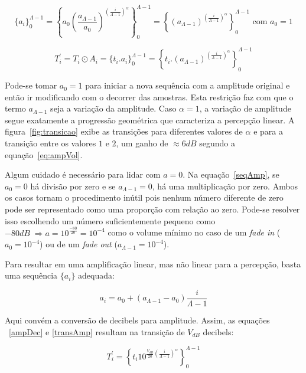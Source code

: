 \begin{equation}\label{seqAmp}
\{a_i\}_0^{\Lambda-1}=\left \{ a_0 \left ( \frac{a_{\Lambda-1}}{a_0} \right )^{\left ( \frac{i}{\Lambda-1} \right )^\alpha} \right \}_0^{\Lambda-1}=\left \{ \left ( {a_{\Lambda-1}} \right )^{\left ( \frac{i}{\Lambda-1} \right )^\alpha} \right \}_0^{\Lambda-1} \text{ com } a_0=1
\end{equation}

\begin{equation}\label{transAmp}
T_i^{'}=T_i \odot A_i = \{t_i . a_i\}_0^{\Lambda-1}=\left \{ t_i . (a_{\Lambda-1} )^{\left ( \frac{i}{\Lambda-1} \right )^\alpha} \right \}_0^{\Lambda-1}
\end{equation}

Pode-se tomar $a_0=1$ para iniciar a nova sequência com a amplitude original e então ir modificando com o decorrer das amostras.
Esta restrição faz com que o termo $a_{\Lambda-1}$ seja a variação da amplitude.
Caso $\alpha=1$, a variação de amplitude segue exatamente a progressão geométrica que caracteriza
a percepção linear. A figura~\ref{fig:transicao} exibe as transições para diferentes valores de $\alpha$ e para a transição entre os valores $1$ e $2$, um ganho de $\approx 6dB$ segundo a equação~\ref{eq:ampVol}.


Algum cuidado é necessário para lidar com $a=0$.
Na equação~\ref{seqAmp}, se $a_0=0$ há divisão por zero e
se $a_{\Lambda-1}=0$, há uma multiplicação por zero. Ambos os casos
tornam o procedimento inútil pois nenhum número diferente de zero pode ser representado como uma proporção com relação ao zero. Pode-se resolver isso escolhendo um número suficientemente pequeno como $-80dB\;\Rightarrow a=10^{\frac{-80}{20}}=10^{-4}$ como o volume mínimo no caso de um
\emph{fade in} ($a_0=10^{-4}$) ou de um \emph{fade out} ($a_{\Lambda-1}=10^{-4}$).


Para resultar em uma amplificação linear, mas não linear para a percepção, basta uma sequência $\{a_i\}$ adequada:

\begin{equation}
a_i=a_0 + (a_{\Lambda-1}-a_0)\frac{i}{\Lambda-1}
\end{equation}

Aqui convém a conversão de decibels para amplitude. Assim, as equações ~\ref{ampDec} e \ref{transAmp}
resultam na transição de $V_{dB}$ decibels:

\begin{equation}
T_i^{'}=\left\{ t_i 10^{\frac{V_{dB}}{20}\left( \frac{i}{\Lambda-1} \right)^\alpha} \right\}_0^{\Lambda-1}
\end{equation}

